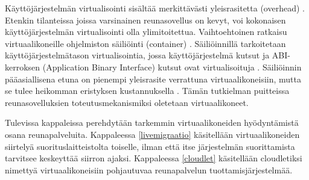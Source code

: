 Käyttöjärjestelmän virtualisointi sisältää merkittävästi yleisrasitetta (overhead) \cite{xavier2013performance}. Etenkin tilanteissa joissa varsinainen reunasovellus on kevyt, voi kokonaisen käyttöjärjestelmän virtualisointi olla ylimitoitettua. Vaihtoehtoinen ratkaisu virtuaalikoneille ohjelmiston säiliöinti (container) \cite{soltesz2007container}.
Säiliöinnillä tarkoitetaan käyttöjärjestelmätason virtualisointia, jossa käyttöjärjestelmä kutsut ja ABI-kerroksen (Application Binary Interface) kutsut ovat virtualisoituja \cite{soltesz2007container}.
Säiliöinnin pääasiallisena etuna on pienempi yleisrasite verrattuna virtuaalikoneisiin, mutta se tulee heikomman eristyksen kustannuksella \cite{soltesz2007container}.
Tämän tutkielman puitteissa reunasovelluksien toteutusmekanismiksi oletetaan virtuaalikoneet.

Tulevissa kappaleissa perehdytään tarkemmin virtuaalikoneiden hyödyntämistä osana reunapalveluita.
Kappaleessa \ref{livemigraatio} käsitellään virtuaalikoneiden siirtelyä suorituslaitteistolta toiselle, ilman että itse järjestelmän suorittamista tarvitsee keskeyttää siirron ajaksi. 
Kappaleessa \ref{cloudlet} käsitellään cloudletiksi nimettyä virtuaalikoneisiin pohjautuvaa reunapalvelun tuottamisjärjestelmää.



